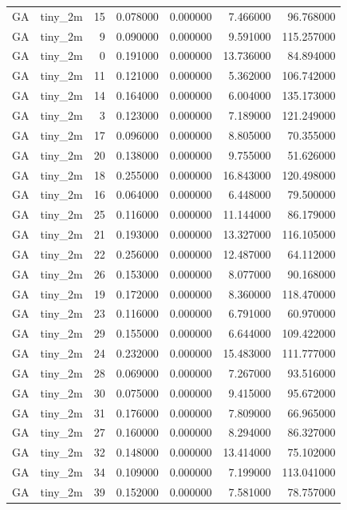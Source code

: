 \begin{tabular}{llrrrrr}
GA & tiny_2m & 15 & 0.078000 & 0.000000 & 7.466000 & 96.768000 \\
GA & tiny_2m & 9 & 0.090000 & 0.000000 & 9.591000 & 115.257000 \\
GA & tiny_2m & 0 & 0.191000 & 0.000000 & 13.736000 & 84.894000 \\
GA & tiny_2m & 11 & 0.121000 & 0.000000 & 5.362000 & 106.742000 \\
GA & tiny_2m & 14 & 0.164000 & 0.000000 & 6.004000 & 135.173000 \\
GA & tiny_2m & 3 & 0.123000 & 0.000000 & 7.189000 & 121.249000 \\
GA & tiny_2m & 17 & 0.096000 & 0.000000 & 8.805000 & 70.355000 \\
GA & tiny_2m & 20 & 0.138000 & 0.000000 & 9.755000 & 51.626000 \\
GA & tiny_2m & 18 & 0.255000 & 0.000000 & 16.843000 & 120.498000 \\
GA & tiny_2m & 16 & 0.064000 & 0.000000 & 6.448000 & 79.500000 \\
GA & tiny_2m & 25 & 0.116000 & 0.000000 & 11.144000 & 86.179000 \\
GA & tiny_2m & 21 & 0.193000 & 0.000000 & 13.327000 & 116.105000 \\
GA & tiny_2m & 22 & 0.256000 & 0.000000 & 12.487000 & 64.112000 \\
GA & tiny_2m & 26 & 0.153000 & 0.000000 & 8.077000 & 90.168000 \\
GA & tiny_2m & 19 & 0.172000 & 0.000000 & 8.360000 & 118.470000 \\
GA & tiny_2m & 23 & 0.116000 & 0.000000 & 6.791000 & 60.970000 \\
GA & tiny_2m & 29 & 0.155000 & 0.000000 & 6.644000 & 109.422000 \\
GA & tiny_2m & 24 & 0.232000 & 0.000000 & 15.483000 & 111.777000 \\
GA & tiny_2m & 28 & 0.069000 & 0.000000 & 7.267000 & 93.516000 \\
GA & tiny_2m & 30 & 0.075000 & 0.000000 & 9.415000 & 95.672000 \\
GA & tiny_2m & 31 & 0.176000 & 0.000000 & 7.809000 & 66.965000 \\
GA & tiny_2m & 27 & 0.160000 & 0.000000 & 8.294000 & 86.327000 \\
GA & tiny_2m & 32 & 0.148000 & 0.000000 & 13.414000 & 75.102000 \\
GA & tiny_2m & 34 & 0.109000 & 0.000000 & 7.199000 & 113.041000 \\
GA & tiny_2m & 39 & 0.152000 & 0.000000 & 7.581000 & 78.757000 \\

\end{tabular}
